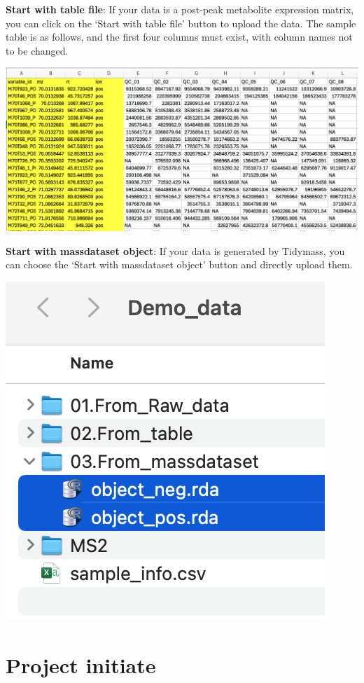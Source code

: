 \documentclass[
]{book}
\begin{document}
\textbf{Start with table file}: If your data is a post-peak metabolite expression matrix, you can click on the `Start with table file' button to upload the data. The sample table is as follows, and the first four columns must exist, with column names not to be changed.

\includegraphics{figures/table_upload.png}

\textbf{Start with massdataset object}: If your data is generated by Tidymass, you can choose the `Start with massdataset object' button and directly upload them.

\includegraphics{figures/object_upload.png}

\section{Project initiate}\label{project-initiate}
\end{document}
